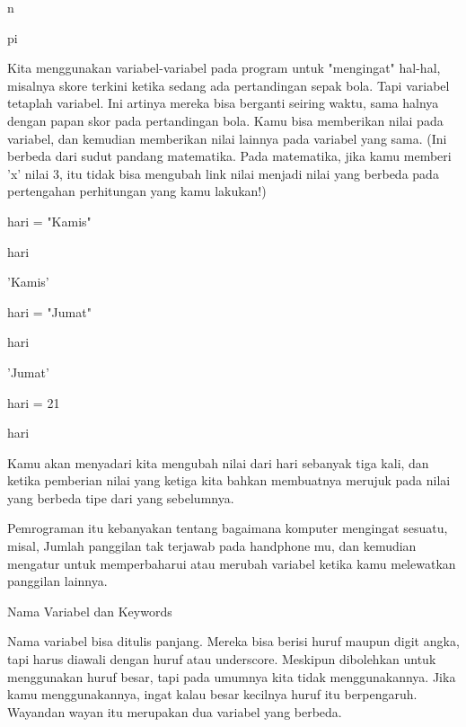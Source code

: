 \noindent 
n \par
{} \par
\noindent 
pi \par
{} \par
\vspace{12pt}
\noindent 
Kita menggunakan variabel-variabel pada program untuk "mengingat" hal-hal, misalnya skore terkini ketika sedang ada pertandingan sepak bola. Tapi variabel tetaplah $  $variabel. Ini artinya mereka bisa berganti seiring waktu, sama halnya dengan papan skor pada pertandingan bola. Kamu bisa memberikan nilai pada variabel, dan kemudian memberikan nilai lainnya pada variabel yang sama. (Ini berbeda dari sudut pandang matematika. Pada matematika, jika kamu memberi 'x' nilai 3, itu tidak bisa mengubah link nilai menjadi nilai yang berbeda pada pertengahan perhitungan yang kamu lakukan!) \par
\vspace{12pt}
\noindent 
hari = "Kamis" \par
\noindent 
hari \par
\noindent 
'Kamis' \par
\noindent 
hari = "Jumat" \par
\noindent 
hari \par
\noindent 
'Jumat' \par
\noindent 
hari = 21 \par
\noindent 
hari \par
{} \par
\vspace{12pt}
\noindent 
Kamu akan menyadari kita mengubah nilai dari $  $hari $  $sebanyak tiga kali, dan ketika pemberian nilai yang ketiga kita bahkan membuatnya merujuk pada nilai yang berbeda tipe dari yang sebelumnya. \par
\vspace{12pt}
\noindent 
Pemrograman itu kebanyakan tentang bagaimana komputer mengingat sesuatu, misal, $  $Jumlah panggilan tak terjawab pada handphone mu, $  $dan kemudian mengatur untuk memperbaharui atau merubah variabel ketika kamu melewatkan panggilan lainnya. \par
\vspace{12pt}
\noindent 
 Nama Variabel dan Keywords \par
\vspace{12pt}
\noindent 
Nama variabel $  $bisa ditulis panjang. Mereka bisa berisi huruf maupun digit angka, tapi harus diawali dengan huruf atau underscore. Meskipun dibolehkan untuk menggunakan huruf besar, tapi pada umumnya kita tidak menggunakannya. Jika kamu menggunakannya, ingat kalau besar kecilnya huruf itu berpengaruh. $  $Wayandan $  $wayan $  $itu merupakan dua variabel yang berbeda. \par
